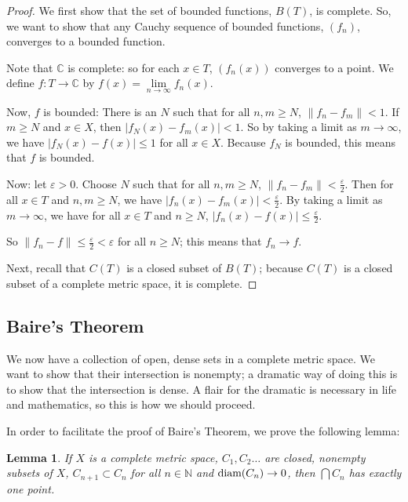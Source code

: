 \documentclass{amsart}
\newcommand{\vep}{\varepsilon}
\newcommand{\C}{\mathbb{C}}
\newcommand{\N}{\mathbb{N}}
\newcommand{\diam}{\text{\rm diam}}
\newcommand{\absval}[1]{\left| #1 \right|}
\newcommand{\norm}[1]{\|#1\|}
\newtheorem{lem}[thm]{Lemma}
\theoremstyle{definition}
\begin{document}
\begin{proof}
We first show that the set of bounded functions, $B(T)$, is complete.
So, we want to show that any Cauchy sequence of bounded functions, $(f_n)$, converges to a bounded function.

Note that $\C$ is complete: so for each $x \in T$, $(f_n(x))$ converges to a point. We define $f: T \to \C$ by $f(x) = \lim\limits_{n \to \infty} f_n(x)$.

Now, $f$ is bounded: 
There is an $N$ such that for all $n,m \geq N$, $\norm{f_n-f_m} < 1$.
If $m \geq N$ and $x \in X$, then $\absval{f_N(x) - f_m(x)} < 1$.
So by taking a limit as $m \to \infty$, we have $\absval{f_N(x) - f(x)} \leq 1$ for all $x \in X$.
Because $f_N$ is bounded, this means that $f$ is bounded.

Now: let $\vep >0$. Choose $N$ such that for all $n,m \geq N$, $\norm{f_n-f_m} < \frac{\vep}{2}$. 
Then for all $x \in T$ and $n,m \geq N$, we have $\absval{f_n(x) - f_m(x)} < \frac{\vep}{2}$.
By taking a limit as $m \to \infty$, we have for all $x \in T$ and $n \geq N$, $\absval{f_n(x) - f(x)} \leq \frac{\vep}{2}$.

So $\norm{f_n - f} \leq \frac{\vep}{2} < \vep$ for all $n \geq N$; this means that $f_n \to f$.

Next, recall that $C(T)$ is a closed subset of $B(T)$; because $C(T)$ is a closed subset of a complete metric space, it is complete.

\end{proof}

\subsection{Baire's Theorem} \hspace*{\fill}

We now have a collection of open, dense sets in a complete metric space. 
We want to show that their intersection is nonempty; a dramatic way of doing this is to show that the intersection is dense. 
A flair for the dramatic is necessary in life and mathematics, so this is how we should proceed.

In order to facilitate the proof of Baire's Theorem, we prove the following lemma:

\begin{lem}
If $X$ is a complete metric space, $C_1, C_2 \ldots$ are closed, nonempty subsets of $X$, $C_{n+1} \subset C_n$ for all $n \in \N$ and $\diam(C_n) \to 0$, then $\bigcap C_n$ has exactly one point.
\end{lem}
\end{document}

